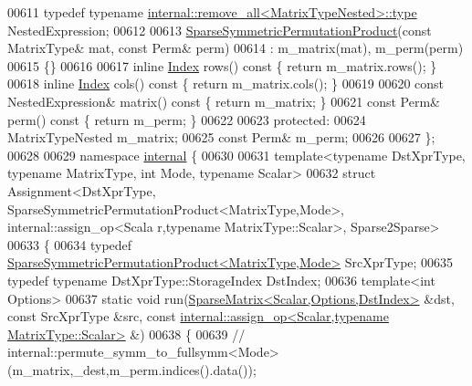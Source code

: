 \begin{DoxyCode}
00611     \textcolor{keyword}{typedef} \textcolor{keyword}{typename} \hyperlink{group___sparse_core___module}{internal::remove\_all<MatrixTypeNested>::type}
       NestedExpression;
00612     
00613     \hyperlink{class_eigen_1_1_sparse_symmetric_permutation_product}{SparseSymmetricPermutationProduct}(\textcolor{keyword}{const} MatrixType& mat, \textcolor{keyword}{const} Perm& 
      perm)
00614       : m\_matrix(mat), m\_perm(perm)
00615     \{\}
00616     
00617     \textcolor{keyword}{inline} \hyperlink{group___core___module_a554f30542cc2316add4b1ea0a492ff02}{Index} rows()\textcolor{keyword}{ const }\{ \textcolor{keywordflow}{return} m\_matrix.rows(); \}
00618     \textcolor{keyword}{inline} \hyperlink{group___core___module_a554f30542cc2316add4b1ea0a492ff02}{Index} cols()\textcolor{keyword}{ const }\{ \textcolor{keywordflow}{return} m\_matrix.cols(); \}
00619         
00620     \textcolor{keyword}{const} NestedExpression& matrix()\textcolor{keyword}{ const }\{ \textcolor{keywordflow}{return} m\_matrix; \}
00621     \textcolor{keyword}{const} Perm& perm()\textcolor{keyword}{ const }\{ \textcolor{keywordflow}{return} m\_perm; \}
00622     
00623   \textcolor{keyword}{protected}:
00624     MatrixTypeNested m\_matrix;
00625     \textcolor{keyword}{const} Perm& m\_perm;
00626 
00627 \};
00628 
00629 \textcolor{keyword}{namespace }\hyperlink{namespaceinternal}{internal} \{
00630   
00631 \textcolor{keyword}{template}<\textcolor{keyword}{typename} DstXprType, \textcolor{keyword}{typename} MatrixType, \textcolor{keywordtype}{int} Mode, \textcolor{keyword}{typename} Scalar>
00632 \textcolor{keyword}{struct }Assignment<DstXprType, SparseSymmetricPermutationProduct<MatrixType,Mode>, internal::assign\_op<Scala
      r,typename MatrixType::Scalar>, Sparse2Sparse>
00633 \{
00634   \textcolor{keyword}{typedef} \hyperlink{class_eigen_1_1_sparse_symmetric_permutation_product}{SparseSymmetricPermutationProduct<MatrixType,Mode>}
       SrcXprType;
00635   \textcolor{keyword}{typedef} \textcolor{keyword}{typename} DstXprType::StorageIndex DstIndex;
00636   \textcolor{keyword}{template}<\textcolor{keywordtype}{int} Options>
00637   \textcolor{keyword}{static} \textcolor{keywordtype}{void} run(\hyperlink{group___sparse_core___module_class_eigen_1_1_sparse_matrix}{SparseMatrix<Scalar,Options,DstIndex>} &dst, \textcolor{keyword}{const} 
      SrcXprType &src, \textcolor{keyword}{const} \hyperlink{struct_eigen_1_1internal_1_1assign__op}{internal::assign\_op<Scalar,typename MatrixType::Scalar>}
       &)
00638   \{
00639     \textcolor{comment}{// internal::permute\_symm\_to\_fullsymm<Mode>(m\_matrix,\_dest,m\_perm.indices().data());}

\end{DoxyCode}
